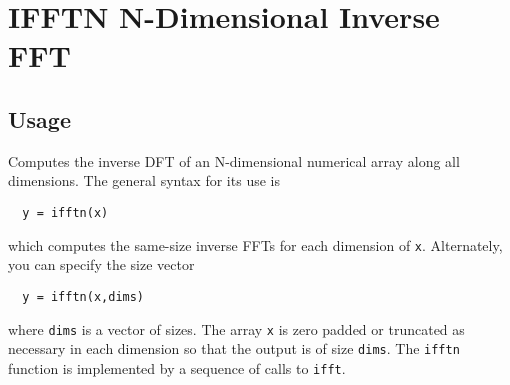 \section{IFFTN N-Dimensional Inverse FFT}

\subsection{Usage}

Computes the inverse DFT of an N-dimensional numerical array along all
dimensions.  The general syntax for its use is
\begin{verbatim}
  y = ifftn(x)
\end{verbatim}
which computes the same-size inverse  FFTs for each dimension of \verb|x|.
Alternately, you can specify the size vector
\begin{verbatim}
  y = ifftn(x,dims)
\end{verbatim}
where \verb|dims| is a vector of sizes.  The array \verb|x| is zero padded
or truncated as necessary in each dimension so that the output
is of size \verb|dims|. The \verb|ifftn| function is implemented by a sequence
of calls to \verb|ifft|.
